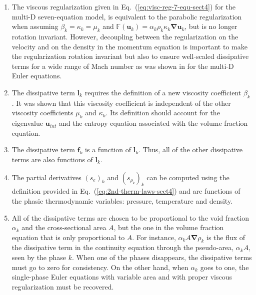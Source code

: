 \documentclass[preprint,10pt]{elsarticle}
\newcommand{\grad}{\mbold{\nabla}}
\newcommand{\mbold}[1]{\boldsymbol#1}
\newcommand{\eqt}[1]{Eq.~(\ref{#1})}                     %
\newcommand{\tcr}[1]{\textcolor{red}{#1}}
\begin{document}
\begin{enumerate}
\item {The viscous regularization given in \eqt{eq:visc-reg-7-equ-sect4} for the multi-D seven-equation model, is equivalent to the parabolic regularization \cite{Parabolic} when assuming $\beta_k = \kappa_k = \mu_k$ and $\mathbb{F}(\mbold u_k) = \alpha_k \rho_k \kappa_k \grad \mbold u_k$, but is no longer rotation invariant. However, decoupling between the regularization on the velocity and on the density in the momentum equation is important to make the regularization rotation invariant but also to ensure well-scaled dissipative terms for a wide range of Mach number as was shown in \cite{Marco_paper_low_mach} for the multi-D Euler equations.}
\item {The dissipative term $\mbold l_k$ requires the definition of a new viscosity
    coefficient $\beta_k$. It was shown that this viscosity coefficient is independent of
    the other viscosity coefficients $\mu_k$ and $\kappa_k$. Its definition should
    account for the eigenvalue $\mbold u_{int}$ and  the entropy equation associated with the volume fraction equation.}

\item {The dissipative term $\mbold f_k$ is a function of $\mbold l_k$. Thus, all of the other
    dissipative terms are also functions of $\mbold l_k$.}

\item {The partial derivatives $(s_e)_k$ and $(s_{\rho_k})_k$ can be computed using the
    definition provided in \eqt{eq:2nd-therm-laws-sect4} and are functions of the phasic thermodynamic
    variables: pressure, temperature and density.}

\item {All of the dissipative terms are chosen to be proportional to the void
    fraction $\alpha_k$ and the cross-sectional area $A$, but the one in the volume fraction equation that is only proportional to $A$. For instance, $\alpha_k A \grad \rho_k$ is the
    flux of the dissipative term in the continuity equation through the pseudo-area, $\alpha_k A$, seen
    by the phase $k$. When one of the phases disappears, the dissipative terms
    must go to zero for consistency. On the other hand, when $\alpha_k$ goes to one,
    the single-phase Euler equations with variable area and with proper viscous regularization must be recovered. }    
    

\end{enumerate}
\end{document}
